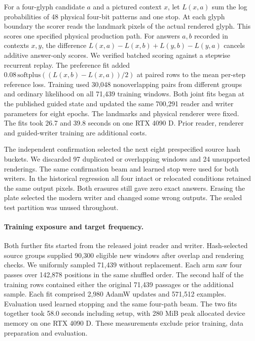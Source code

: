 \documentclass[12pt,a4paper]{article}
\providecommand{\DIFadd}[1]{{\protect\color{blue} \sf #1}} %
\begin{document}
\DIFadd{For a four-glyph candidate $a$ and a pictured context $x$, let $L(x,a)$ sum the log probabilities of 48 physical four-bit patterns and one stop. At each glyph boundary the scorer reads the landmark pixels of the actual rendered glyph. This scores one specified physical production path. For answers $a,b$ recorded in contexts $x,y$, the difference $L(x,a)-L(x,b)+L(y,b)-L(y,a)$ cancels additive answer-only scores. We verified batched scoring against a stepwise recurrent replay. The preference fit added $0.08\,\mathrm{softplus}((L(x,b)-L(x,a))/2)$ at paired rows to the mean per-step reference loss. Training used 30,048 nonoverlapping pairs from different groups and ordinary likelihood on all 71,439 training windows. Both joint fits began at the published guided state and updated the same 700,291 reader and writer parameters for eight epochs. The landmarks and physical renderer were fixed. The fits took 26.7 and 39.8 seconds on one RTX 4090 D. Prior reader, renderer and guided-writer training are additional costs.
}

\DIFadd{The independent confirmation selected the next eight prespecified source hash buckets. We discarded 97 duplicated or overlapping windows and 24 unsupported renderings. The same confirmation beam and learned stop were used for both writers. In the historical regression all four intact or relocated conditions retained the same output pixels. Both erasures still gave zero exact answers. Erasing the plate selected the modern writer and changed some wrong outputs. The sealed test partition was unused throughout.
}

\paragraph{\DIFadd{Training exposure and target frequency.}}
\DIFadd{Both further fits started from the released joint reader and writer. Hash-selected source groups supplied 90,300 eligible new windows after overlap and rendering checks. We uniformly sampled 71,439 without replacement. Each arm saw four passes over 142,878 positions in the same shuffled order. The second half of the training rows contained either the original 71,439 passages or the additional sample. Each fit comprised 2,980 AdamW updates and 571,512 examples. Evaluation used learned stopping and the same four-path beam. The two fits together took 58.0 seconds including setup, with 280 MiB peak allocated device memory on one RTX 4090 D. These measurements exclude prior training, data preparation and evaluation.
}
\end{document}

